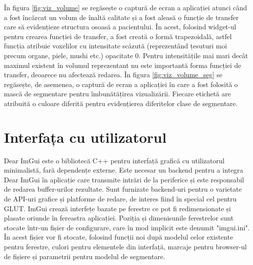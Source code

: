 În figura \ref{fig:viz_volume} se regăsește o captură de ecran a aplicației atunci când a fost încărcat un volum de înaltă calitate și a fost aleasă o funcție de transfer care să evidențieze structura osoasă a pacientului. În acest, folosind widget-ul pentru crearea funcției de transfer, a fost creată o formă trapezoidală, astfel funcția atribuie voxelilor cu intensitate scăzută (reprezentând țesuturi moi precum organe, piele, mushi etc.) opacitate 0. Pentru intensitățile mai mari decât maximul existent în volumul reprezentant nu este importantă forma funcției de transfer, deoarece nu afectează redarea. În figura \ref{fig:viz_volume_seg} se regăsește, de asemenea, o captură de ecran a aplicației în care a fost folosită o mască de segmentare pentru îmbunătățirea vizualizării. Fiecare etichetă are atribuită o culoare diferită pentru evidențierea diferitelor clase de segmentare.


\section{Interfața cu utilizatorul}

Dear ImGui este o bibliotecă C++ pentru interfață grafică cu utilizatorul minimalistă, fară dependențe externe. Este necesar un backend pentru a integra Dear ImGui în aplicație care transmite intrări de la periferice și este responsabil de redarea buffer-urilor rezultate. Sunt furnizate backend-uri pentru o varietate de API-uri grafice și platforme de redare, de interes fiind în special cel pentru GLUT. ImGui crează interfețe bazate pe ferestre ce pot fi redimensionate și plasate oriunde în fereastra aplicației. Poziția și dimenisunile ferestrelor sunt stocate într-un fișier de configurare, care în mod implicit este denumit "imgui.ini". În acest fișier vor fi stocate, folosind funcții noi după modelul celor existente pentru ferestre, culori pentru elementele din interfață, marcaje pentru browser-ul de fișiere și parametrii pentru modelul de segmentare.


